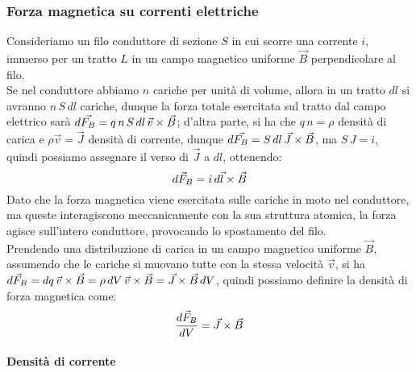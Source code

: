 \subsubsection{Forza magnetica su correnti elettriche}

Consideriamo un filo conduttore di sezione $ S $ in cui scorre una corrente $ i $, immerso per un tratto $ L $ in un campo magnetico uniforme $ \vec{B} $ perpendicolare al filo. \\ 
%
Se nel conduttore abbiamo $ n $ cariche per unità di volume, allora in un tratto $ dl $  si avranno $ n \, S \, dl $ cariche, dunque la forza totale esercitata sul tratto dal campo elettrico sarà $ d\vec{F_B} = q \, n \, S \, dl \, \vec{v}\times\vec{B} $; d'altra parte, si ha che $ q \, n = \rho $ densità di carica e $ \rho \vec{v} = \vec{J} $ densità di corrente, dunque $ d\vec{F_B} = S \, dl \, \vec{J}\times\vec{B} $, ma $ S \, J = i $, quindi possiamo assegnare il verso di $ \vec{J} $ a $ dl $, ottenendo:
\begin{equation}
	d\vec{F}_B = i \, d\vec{l}\times\vec{B}
	\label{eq:forza-filo}
\end{equation}
Dato che la forza magnetica viene esercitata sulle cariche in moto nel conduttore, ma queste interagiscono meccanicamente con la sua struttura atomica, la forza agisce sull'intero conduttore, provocando lo spostamento del filo. \\ 
%
Prendendo una distribuzione di carica in un campo magnetico uniforme $ \vec{B} $, assumendo che le cariche si muovano tutte con la stessa velocità $ \vec{v} $, si ha $ d\vec{F}_B = dq \, \vec{v}\times\vec{B} = \rho \, dV \, \vec{v}\times\vec{B} = \vec{J}\times\vec{B} \, dV $, quindi possiamo definire la densità di forza magnetica come:
\begin{equation}
	\displaystyle\frac{d\vec{F}_B}{dV} = \vec{J}\times\vec{B}
	\label{eq:dens-f-mag}
\end{equation}

\paragraph{Densità di corrente}

